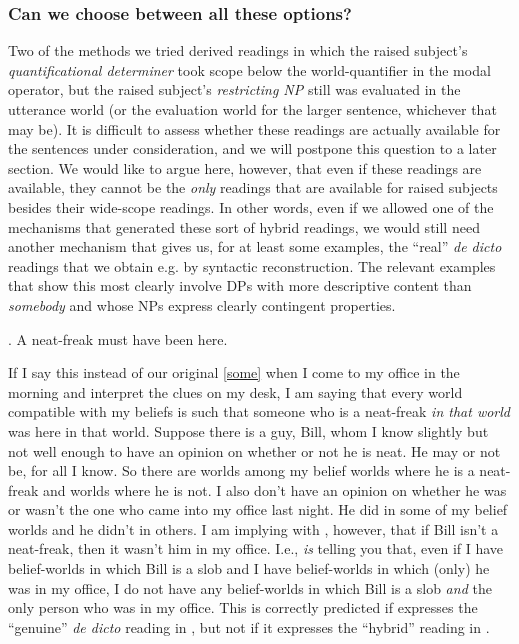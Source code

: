 \subsubsection{Can we choose between all these options?}\label{semrec}

Two of the methods we tried derived readings in which the raised subject's \emph{quantificational determiner} took scope below the world-quantifier in the modal operator, but the raised subject's \emph{restricting NP} still was evaluated in the utterance world (or the evaluation world for the larger sentence, whichever that may be). It is difficult to assess whether these readings are actually available for the sentences under consideration, and we will postpone this question to a later section. We would like to argue here, however, that even if these readings are available, they cannot be the \emph{only} readings that are available for raised subjects besides their wide-scope readings. In other words, even if we allowed one of the mechanisms that generated these sort of hybrid readings, we would still need another mechanism that gives us, for at least some examples, the ``real'' \emph{de dicto} readings that we obtain e.g. by syntactic reconstruction. The relevant examples that show this most clearly involve DPs with more descriptive content than \emph{somebody} and whose NPs express clearly contingent properties.

\ex. A neat-freak must have been here.

\enlargethispage{36pt}If I say this instead of our original \ref{some} when I come to my office in the morning and interpret the clues on my desk, I am saying that every world compatible with my beliefs is such that someone who is a neat-freak \emph{in that world} was here in that world. Suppose there is a guy, Bill, whom I know slightly but not well enough to have an opinion on whether or not he is neat. He may or not be, for all I know. So there are worlds among my belief worlds where he is a neat-freak and worlds where he is not. I also don't have an opinion on whether he was or wasn't the one who came into my office last night. He did in some of my belief worlds and he didn't in others. I am implying with \Last, however, that if Bill isn't a neat-freak, then it wasn't him in my office. I.e., \Last \emph{is} telling you that, even if I have belief-worlds in which Bill is a slob and I have belief-worlds in which (only) he was in my office, I do not have any belief-worlds in which Bill is a slob \emph{and} the only person who was in my office. This is correctly predicted if \Last expresses the ``genuine'' \emph{de dicto} reading in \Next, but not if it expresses the ``hybrid'' reading in \NNext.

